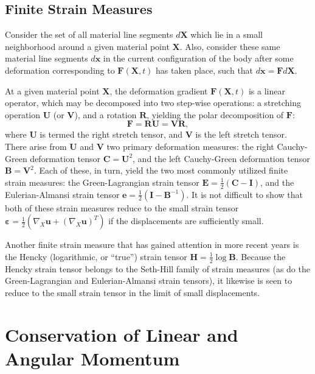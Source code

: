 \subsection*{Finite Strain Measures}

Consider the set of all material line segments $d \mathbf{X}$ which lie in a small neighborhood around a given material point $\mathbf{X}$. Also, consider these same material line segments $d \mathbf{x}$ in the current configuration of the body after some deformation corresponding to $\mathbf{F} (\mathbf{X}, t)$ has taken place, such that $d \mathbf{x} = \mathbf{F} d \mathbf{X}$.

At a given material point $\mathbf{X}$, the deformation gradient $\mathbf{F} (\mathbf{X}, t)$ is a linear operator, which may be decomposed into two step-wise operations: a stretching operation $\mathbf{U}$ (or $\mathbf{V}$), and a rotation $\mathbf{R}$, yielding the polar decomposition of $\mathbf{F}$:
\begin{equation}
  \mathbf{F} = \mathbf{R} \mathbf{U} = \mathbf{V} \mathbf{R},
\end{equation}
where $\mathbf{U}$ is termed the right stretch tensor, and $\mathbf{V}$ is the left stretch tensor. There arise from $\mathbf{U}$ and $\mathbf{V}$ two primary deformation measures: the right Cauchy-Green deformation tensor $\mathbf{C} = \mathbf{U}^2$, and the left Cauchy-Green deformation tensor $\mathbf{B} = \mathbf{V}^2$. Each of these, in turn, yield the two most commonly utilized finite strain measures: the Green-Lagrangian strain tensor $\mathbf{E} = \frac{1}{2} (\mathbf{C} - \mathbf{I})$, and the Eulerian-Almansi strain tensor $\mathbf{e} = \frac{1}{2} (\mathbf{I} - \mathbf{B}^{-1})$. It is not difficult to show that both of these strain measures reduce to the small strain tensor $\boldsymbol{\varepsilon} = \frac{1}{2} (\nabla_X \mathbf{u} + (\nabla_X \mathbf{u})^T)$ if the displacements are sufficiently small.

Another finite strain measure that has gained attention in more recent years is the Hencky (logarithmic, or ``true'') strain tensor $\mathbf{H} = \frac{1}{2} \log \mathbf{B}$. Because the Hencky strain tensor belongs to the Seth-Hill family of strain measures (as do the Green-Lagrangian and Eulerian-Almansi strain tensors), it likewise is seen to reduce to the small strain tensor in the limit of small displacements.

\section{Conservation of Linear and Angular Momentum}

